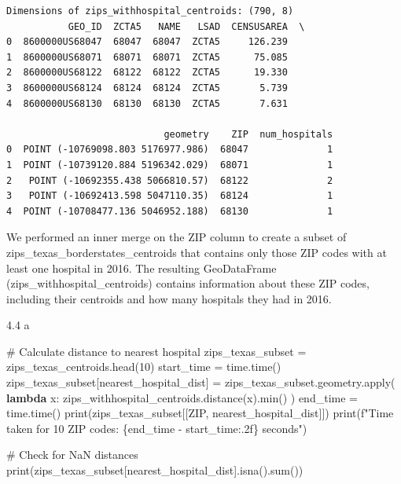 \documentclass[
  letterpaper,
  DIV=11,
  numbers=noendperiod]{scrartcl}
\newenvironment{Shaded}{\begin{snugshade}}{\end{snugshade}}
\newcommand{\BuiltInTok}[1]{\textcolor[rgb]{0.00,0.23,0.31}{#1}}
\newcommand{\CommentTok}[1]{\textcolor[rgb]{0.37,0.37,0.37}{#1}}
\newcommand{\DecValTok}[1]{\textcolor[rgb]{0.68,0.00,0.00}{#1}}
\newcommand{\KeywordTok}[1]{\textcolor[rgb]{0.00,0.23,0.31}{\textbf{#1}}}
\newcommand{\NormalTok}[1]{\textcolor[rgb]{0.00,0.23,0.31}{#1}}
\newcommand{\OperatorTok}[1]{\textcolor[rgb]{0.37,0.37,0.37}{#1}}
\newcommand{\SpecialCharTok}[1]{\textcolor[rgb]{0.37,0.37,0.37}{#1}}
\newcommand{\SpecialStringTok}[1]{\textcolor[rgb]{0.13,0.47,0.30}{#1}}
\newcommand{\StringTok}[1]{\textcolor[rgb]{0.13,0.47,0.30}{#1}}
\begin{document}
\begin{verbatim}
Dimensions of zips_withhospital_centroids: (790, 8)
           GEO_ID  ZCTA5   NAME   LSAD  CENSUSAREA  \
0  8600000US68047  68047  68047  ZCTA5     126.239   
1  8600000US68071  68071  68071  ZCTA5      75.085   
2  8600000US68122  68122  68122  ZCTA5      19.330   
3  8600000US68124  68124  68124  ZCTA5       5.739   
4  8600000US68130  68130  68130  ZCTA5       7.631   

                            geometry    ZIP  num_hospitals  
0  POINT (-10769098.803 5176977.986)  68047              1  
1  POINT (-10739120.884 5196342.029)  68071              1  
2   POINT (-10692355.438 5066810.57)  68122              2  
3   POINT (-10692413.598 5047110.35)  68124              1  
4  POINT (-10708477.136 5046952.188)  68130              1  
\end{verbatim}

We performed an inner merge on the ZIP column to create a subset of
zips\_texas\_borderstates\_centroids that contains only those ZIP codes
with at least one hospital in 2016. The resulting GeoDataFrame
(zips\_withhospital\_centroids) contains information about these ZIP
codes, including their centroids and how many hospitals they had in
2016.

4.4 a

\begin{Shaded}
\begin{Highlighting}[]
\CommentTok{\# Calculate distance to nearest hospital}
\NormalTok{zips\_texas\_subset }\OperatorTok{=}\NormalTok{ zips\_texas\_centroids.head(}\DecValTok{10}\NormalTok{)}
\NormalTok{start\_time }\OperatorTok{=}\NormalTok{ time.time()}
\NormalTok{zips\_texas\_subset[}\StringTok{\textquotesingle{}nearest\_hospital\_dist\textquotesingle{}}\NormalTok{] }\OperatorTok{=}\NormalTok{ zips\_texas\_subset.geometry.}\BuiltInTok{apply}\NormalTok{(}
    \KeywordTok{lambda}\NormalTok{ x: zips\_withhospital\_centroids.distance(x).}\BuiltInTok{min}\NormalTok{()}
\NormalTok{)}
\NormalTok{end\_time }\OperatorTok{=}\NormalTok{ time.time()}
\BuiltInTok{print}\NormalTok{(zips\_texas\_subset[[}\StringTok{\textquotesingle{}ZIP\textquotesingle{}}\NormalTok{, }\StringTok{\textquotesingle{}nearest\_hospital\_dist\textquotesingle{}}\NormalTok{]])}
\BuiltInTok{print}\NormalTok{(}\SpecialStringTok{f"Time taken for 10 ZIP codes: }\SpecialCharTok{\{}\NormalTok{end\_time }\OperatorTok{{-}}\NormalTok{ start\_time}\SpecialCharTok{:.2f\}}\SpecialStringTok{ seconds"}\NormalTok{)}

\CommentTok{\# Check for NaN distances}
\BuiltInTok{print}\NormalTok{(zips\_texas\_subset[}\StringTok{\textquotesingle{}nearest\_hospital\_dist\textquotesingle{}}\NormalTok{].isna().}\BuiltInTok{sum}\NormalTok{())}
\end{Highlighting}
\end{Shaded}
\end{document}
